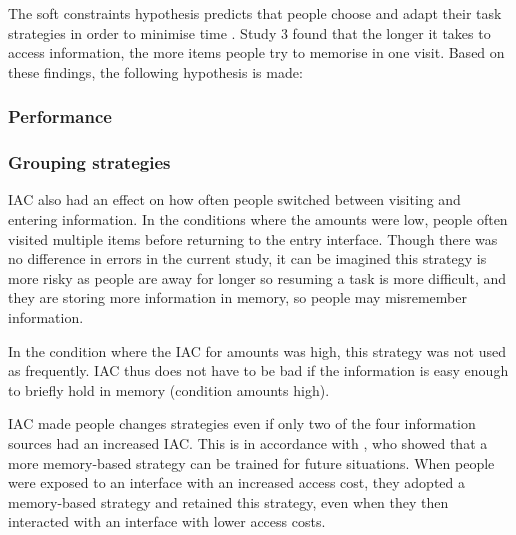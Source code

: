 The soft constraints hypothesis predicts that people choose and adapt their task strategies in order to minimise time \citep{Gray2006}. Study 3 found that the longer it takes to access information, the more items people try to memorise in one visit. Based on these findings, the following hypothesis is made: 

\subsubsection{Performance}

\subsubsection{Grouping strategies}
IAC also had an effect on how often people switched between visiting and entering information. In the conditions where the amounts were low, people often visited multiple items before returning to the entry interface. Though there was no difference in errors in the current study, it can be imagined this strategy is more risky as people are away for longer so resuming a task is more difficult, and they are storing more information in memory, so people may misremember information.

In the condition where the IAC for amounts was high, this strategy was not used as frequently. 
IAC thus does not have to be bad if the information is easy enough to briefly hold in memory (condition amounts high).

IAC made people changes strategies even if only two of the four information sources had an increased IAC. This is in accordance with \citep{Morgan2014}, who showed that a more memory-based strategy can be trained for future situations. When people were exposed to an interface with an increased access cost, they adopted a memory-based strategy and retained this strategy, even when they then interacted with an interface with lower access costs.



